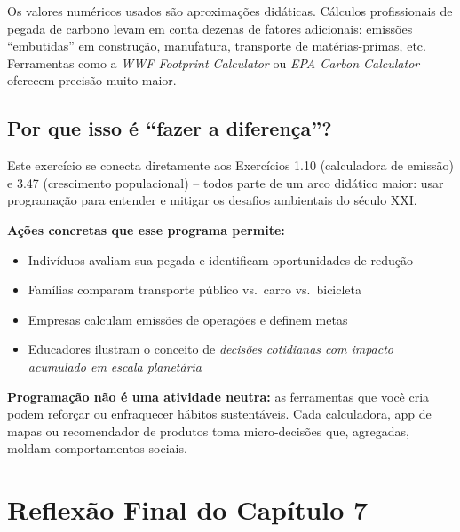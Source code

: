 \documentclass[12pt,a4paper]{article}
\begin{document}
\bigskip

\begin{atencao}
Os valores numéricos usados são aproximações didáticas. Cálculos profissionais
de pegada de carbono levam em conta dezenas de fatores adicionais: emissões
``embutidas'' em construção, manufatura, transporte de matérias-primas, etc.
Ferramentas como a \textit{WWF Footprint Calculator} ou \textit{EPA Carbon Calculator}
oferecem precisão muito maior.
\end{atencao}

\subsection*{Por que isso é ``fazer a diferença''?}

\begin{tcolorbox}[colback=ecolightgreen,colframe=ecogreen,
  title={\bfseries Conexão com a sustentabilidade global}]

Este exercício se conecta diretamente aos Exercícios 1.10 (calculadora de emissão)
e 3.47 (crescimento populacional) -- todos parte de um arco didático maior:
usar programação para entender e mitigar os desafios ambientais do século XXI.

\textbf{Ações concretas que esse programa permite:}
\begin{itemize}[noitemsep]
  \item Indivíduos avaliam sua pegada e identificam oportunidades de redução
  \item Famílias comparam transporte público vs.\ carro vs.\ bicicleta
  \item Empresas calculam emissões de operações e definem metas
  \item Educadores ilustram o conceito de \textit{decisões cotidianas com impacto
  acumulado em escala planetária}
\end{itemize}

\textbf{Programação não é uma atividade neutra:} as ferramentas que você cria
podem reforçar ou enfraquecer hábitos sustentáveis. Cada calculadora, app de
mapas ou recomendador de produtos toma micro-decisões que, agregadas, moldam
comportamentos sociais.
\end{tcolorbox}

\newpage

\section*{Reflexão Final do Capítulo 7}
\end{document}
